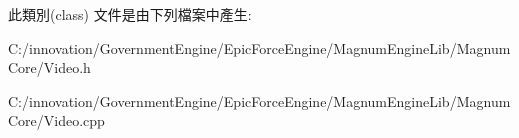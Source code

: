 此類別(class) 文件是由下列檔案中產生\+:\begin{DoxyCompactItemize}
\item 
C\+:/innovation/\+Government\+Engine/\+Epic\+Force\+Engine/\+Magnum\+Engine\+Lib/\+Magnum\+Core/Video.\+h\item 
C\+:/innovation/\+Government\+Engine/\+Epic\+Force\+Engine/\+Magnum\+Engine\+Lib/\+Magnum\+Core/Video.\+cpp\end{DoxyCompactItemize}
